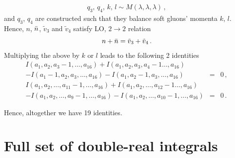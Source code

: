 \documentclass[a4paper,11pt]{report}
\numberwithin{equation}{section}
\begin{document}
\begin{enumerate}
\begin{eqnarray}
    q_3,\, q_4,\, k,\, l \sim M (\lambda, \lambda, \lambda)\,,
  \end{eqnarray}
  and $q_3$, $q_4$ are constructed such that they balance soft gluons' momenta
  $k$, $l$. Hence, $n$, $\bar{n}$, $\tilde v_3$ and $\tilde v_4$ satisfy LO, $2\to 2$ relation
  \begin{equation}
    n + \bar{n} = \tilde v_3 + \tilde v_4\,.
  \end{equation}
  Multiplying the above by $k$ or $l$ leads to the following 2 identities
  \begin{eqnarray}
    I(a_1,a_2, a_3-1,\ldots, a_{16}) 
    + I(a_1,a_2, a_3,a_4-1\ldots, a_{16}) & & \nonumber \\ 
    - I(a_1-1,a_2, a_3,\ldots, a_{16})  
    - I(a_1,a_2-1, a_3,\ldots, a_{16})   & = & 0\,,
    \\
    I(a_1,a_2, \ldots, a_{11}-1,\ldots, a_{16}) 
    + I(a_1,a_2, \ldots ,a_{12}-1\ldots, a_{16}) & &  \nonumber \\
    - I(a_1,a_2, \dots, a_{9}-1,\ldots, a_{16})   
    - I(a_1,a_2, \dots, a_{10}-1,\ldots, a_{16}) & = & 0\,.
  \end{eqnarray}
\end{enumerate}

Hence, altogether  we have  19 identities.

\section{Full set of double-real integrals}
\end{document}
